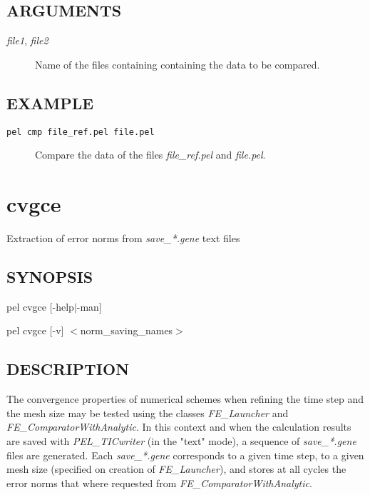 \documentclass{article}
\begin{document}
\subsection*{ARGUMENTS\label{cmp_ARGUMENTS}}
\begin{description}

\item[\emph{file1}, \emph{file2}] \mbox{}

Name of the files containing containing the 
data to be compared.

\end{description}
\subsection*{EXAMPLE\label{cmp_EXAMPLE}}
\begin{description}

\item[\texttt{pel cmp file\_ref.pel file.pel}] \mbox{}

Compare the data of the files \emph{file\_ref.pel} and \emph{file.pel}.

\end{description}
\clearpage
\section{cvgce\label{cvgce}}


Extraction of error norms from \emph{save\_*.gene} text files

\subsection*{SYNOPSIS\label{cvgce_SYNOPSIS}}


pel cvgce [-help$|$-man]



pel cvgce [-v] $<$norm\_saving\_names$>$

\subsection*{DESCRIPTION\label{cvgce_DESCRIPTION}}


The convergence properties of numerical schemes when refining
the time step and the mesh size may be tested using the classes
\emph{FE\_Launcher} and \emph{FE\_ComparatorWithAnalytic}. In this context and
when the calculation
results are saved with \emph{PEL\_TICwriter} (in the "text" mode), a sequence
of \emph{save\_*.gene} files are generated.
Each \emph{save\_*.gene} corresponds to a given
time step, to a given mesh size (specified on creation of \emph{FE\_Launcher}),
and stores at all cycles the error norms that where requested
from \emph{FE\_ComparatorWithAnalytic}.
\end{document}
